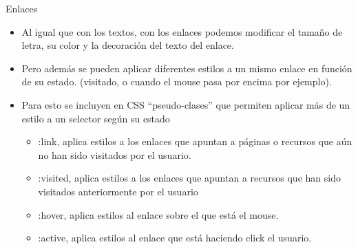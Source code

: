 \documentclass[aspectratio=43,10pt,t]{beamer}
\begin{document}
\begin{frame}{Enlaces}\relax
\begingroup
{}
\begin{itemize}
  \item\relax Al igual que con los textos, con los enlaces podemos modificar el tamaño de letra, su color y la decoración del texto del enlace.
  \item\relax Pero además se pueden aplicar diferentes estilos a un mismo enlace en función de su estado. (visitado, o cuando el mouse pasa por encima por ejemplo).
  \item\relax Para esto se incluyen en CSS “pseudo-clases” que permiten aplicar más de un estilo a un selector según su estado
  \begin{itemize}
    \item\relax :link, aplica estilos a los enlaces que apuntan a páginas o recursos que aún no han sido visitados por el usuario.
    \item\relax :visited, aplica estilos a los enlaces que apuntan a recursos que han sido visitados anteriormente por el usuario
    \item\relax :hover, aplica estilos al enlace sobre el que está el mouse.
    \item\relax :active, aplica estilos al enlace que está haciendo click el usuario.
  \end{itemize}
\end{itemize}
\endgroup
\end{frame}
\end{document}
